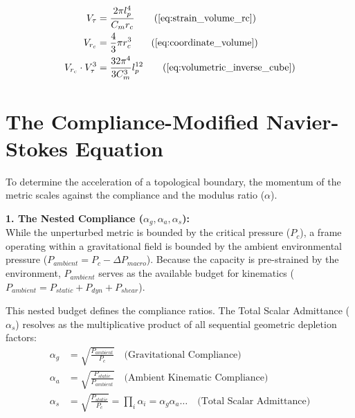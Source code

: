 \begin{tcolorbox}[recallbox, title={\ref{box:volumetric_inverse_cube}. The Volumetric Inverse-Cube Identity}]
\begin{align}
    V_\tau &= \frac{2\pi l_p^4}{C_m r_c} \tag{\ref{eq:strain_volume_rc}} \\ %
    V_{r_c} &= \frac{4}{3}\pi r_c^3 \tag{\ref{eq:coordinate_volume}} \\
    V_{r_c} \cdot V_\tau^3 &= \frac{32\pi^4}{3C_m^3} l_p^{12} \tag{\ref{eq:volumetric_inverse_cube}} 
\end{align}
\end{tcolorbox}

\section{The Compliance-Modified Navier-Stokes Equation}
\label{sec:deriv_admittance_ns}

To determine the acceleration of a topological boundary, the momentum of the metric scales against the compliance and the modulus ratio ($\alpha$). %
\vspace{0.2 cm}

\textbf{1. The Nested Compliance ($\alpha_g, \alpha_a, \alpha_s$):} \\
While the unperturbed metric is bounded by the critical pressure ($P_c$), a frame operating within a gravitational field is bounded by the ambient environmental pressure ($P_{ambient} = P_c - \Delta P_{macro}$). Because the capacity is pre-strained by the environment, $P_{ambient}$ serves as the available budget for kinematics ($P_{ambient} = P_{static} + P_{dyn} + P_{shear}$). 

This nested budget defines the compliance ratios. The Total Scalar Admittance ($\alpha_s$) resolves as the multiplicative product of all sequential geometric depletion factors: %
\begin{align}
    \alpha_g &= \sqrt{\frac{P_{ambient}}{P_c}} \quad \text{(Gravitational Compliance)} \\
    \alpha_a &= \sqrt{\frac{P_{static}}{P_{ambient}}} \quad \text{(Ambient Kinematic Compliance)} \\
    \alpha_s &= \sqrt{\frac{P_{static}}{P_c}} = \prod_i \alpha_i = \alpha_g \alpha_a \dots \quad \text{(Total Scalar Admittance)}
\end{align}

